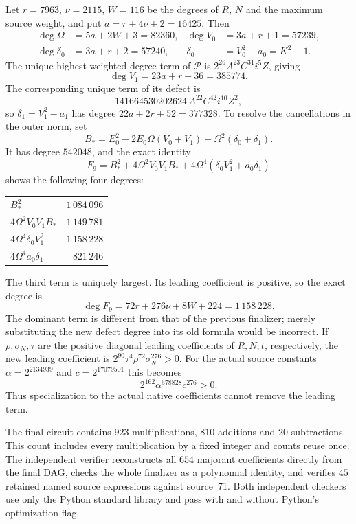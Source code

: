 Let $r=7963$, $\nu=2115$, $W=116$ be the degrees of $R$, $N$ and the
maximum source weight, and put $a=r+4\nu+2=16425$.  Then
\begin{align*}
 \deg\Omega&=5a+2W+3=82360,&\deg V_0&=3a+r+1=57239,\\
 \deg\delta_0&=3a+r+2=57240,&
 \delta_0&=V_0^2-a_0=K^2-1.
\end{align*}
The unique highest weighted-degree term of $\mathcal P$ is
$2^{26}A^{23}C^{31}i^5Z$, giving
\[
 \deg V_1=23a+r+36=385774.
\]
The corresponding unique term of its defect is
\[
 141664530202624\,A^{22}C^{42}i^{10}Z^2,
\]
so $\delta_1=V_1^2-a_1$ has degree $22a+2r+52=377328$.
To resolve the cancellations in the outer norm, set
\[
 B_*=E_0^2-2E_0\Omega(V_0+V_1)+\Omega^2(\delta_0+\delta_1).
\]
It has degree $542048$, and the exact identity
\begin{equation}
 F_9=B_*^2+4\Omega^2V_0V_1B_*
                 +4\Omega^4(\delta_0V_1^2+a_0\delta_1)       \label{eq:resolvednorm}
\end{equation}
shows the following four degrees:
\begin{center}
\begin{tabular}{lr}
$B_*^2$ & $1\,084\,096$\\
$4\Omega^2V_0V_1B_*$ & $1\,149\,781$\\
$4\Omega^4\delta_0V_1^2$ & $1\,158\,228$\\
$4\Omega^4a_0\delta_1$ & $821\,246$
\end{tabular}
\end{center}
The third term is uniquely largest.  Its leading coefficient is positive,
so the exact degree is
\[
 \boxed{\deg F_9=72r+276\nu+8W+224=1\,158\,228.}
\]
The dominant term is different from that of the previous finalizer;
merely substituting the new defect degree into its old formula would be
incorrect.  If $\rho,\sigma_N,\tau$ are the positive diagonal leading
coefficients of $R,N,t$, respectively, the new leading coefficient is
$2^{90}\tau^4\rho^{72}\sigma_N^{276}>0$.  For the actual source constants
$\alpha=2^{2134939}$ and $c=2^{17079501}$ this becomes
\[
 2^{162}\alpha^{578828}c^{276}>0.
\]
Thus specialization to the actual native coefficients cannot remove the
leading term.

The final circuit contains $923$ multiplications, $810$ additions and
$20$ subtractions.  This count includes every multiplication by a fixed
integer and counts reuse once.  The independent verifier reconstructs
all $654$ majorant coefficients directly from the final DAG, checks the
whole finalizer as a polynomial identity, and verifies $45$ retained
named source expressions against source~71.  Both independent checkers
use only the Python standard library and pass with and without Python's
optimization flag.

